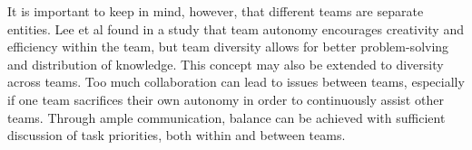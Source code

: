 It is important to keep in mind, however, that different teams are separate entities.
Lee et al\cite{LEE} found in a study that team autonomy encourages creativity and efficiency within the team, but team diversity allows for better problem-solving and distribution of knowledge.
This concept may also be extended to diversity across teams.
Too much collaboration can lead to issues between teams, especially if one team sacrifices their own autonomy in order to continuously assist other teams.
Through ample communication, balance can be achieved with sufficient discussion of task priorities, both within and between teams.

